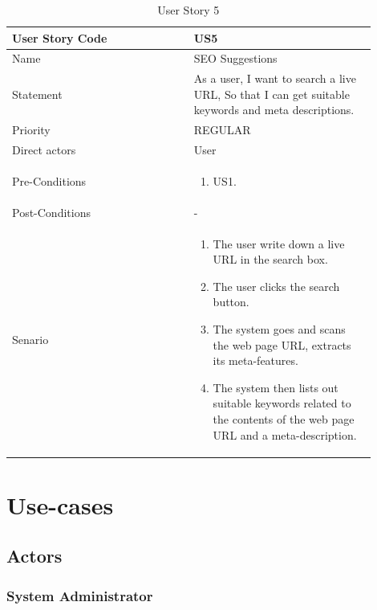 \documentclass{scrartcl}
\begin{document}
\begin{table}[H]
  \caption{User Story 5}
  \begin{tabular}{p{0.45\linewidth} | p{0.45\linewidth}}
    \toprule
    User Story Code & US5 \\
    \midrule
    Name & SEO Suggestions \\
    \hline
    Statement & As a user, I want to search a live URL, So that I can get suitable keywords and meta descriptions. \\
    \hline
    Priority & REGULAR \\
    \hline
    Direct actors & User \\
    \hline
    Pre-Conditions & {
                     \begin{enumerate}
                     \item US1.
                     \end{enumerate}
                     } \\
    \hline
    Post-Conditions & - \\
    \hline
    Senario & {
              \begin{enumerate}
              \item The user write down a live URL in the search box.
              \item The user clicks the search button.
              \item The system goes and scans the web page URL, extracts its meta-features.
              \item The system then lists out suitable keywords related to the contents of the web page URL and a meta-description.
              \end{enumerate}
              } \\
    \bottomrule
  \end{tabular}
\end{table}

\section{Use-cases}

\subsection{Actors}

\subsubsection{System Administrator}
\end{document}
